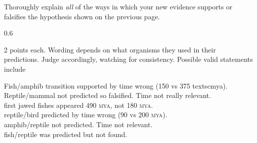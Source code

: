 Thoroughly explain \emph{all} of the ways in which your new evidence
supports or falsifies the hypothesis shown on the previous page.

\begin{AnswerPage}{0.6\textheight}

2 points each. Wording depends on what organisms they used in their predictions. Judge accordingly, watching for consistency. Possible valid statements include \vspace{\baselineskip}

Fish/amphib transition supported by time wrong (150 vs 375 textsc{mya}).\\
Reptile/mammal not predicted so falsified. Time not really relevant.\\
first jawed fishes appeared 490 \textsc{mya}, not 180 \textsc{mya}.\\
reptile/bird predicted by time wrong (90 vs 200 \textsc{mya}).\\
amphib/reptile not predicted. Time not relevant.\\
fish/reptile was predicted but not found. \\


\end{AnswerPage}

